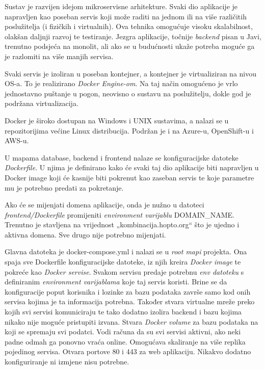 		
		Sustav je razvijen idejom mikroservisne arhitekture. Svaki dio aplikacije je napravljen kao poseban servis koji može raditi na jednom ili na više različitih poslužitelja (i fizičkih i virtualnih). Ova tehnika omogućuje visoku skalabilnost, olakšan daljnji razvoj te testiranje. Jezgra aplikacije, točnije  \textit{backend} pisan u Javi, trenutno podsjeća na monolit, ali ako se u budućnosti ukaže potreba moguće ga je razlomiti na više manjih servisa. 

		Svaki servis je izoliran u poseban kontejner, a kontejner je virtualiziran na nivou OS-a. To je realizirano  \textit{Docker Engine-om}. Na taj način omogućeno je vrlo jednostavno puštanje u pogon, neovisno o sustavu na poslužitelju, dokle god je podržana virtualizacija. 

		Docker je široko dostupan na Windows i UNIX sustavima, a nalazi se u repozitorijima većine Linux distribucija. Podržan je i na Azure-u, OpenShift-u i AWS-u.\\
		
		
		
	
		U mapama database, backend i frontend nalaze se konfiguracijske datoteke  \textit{Dockerfile}. U njima je definirano kako će svaki taj dio aplikacije biti napravljen u Docker image koji će kasnije biti pokrenut kao zaseban servis te koje parametre mu je potrebno predati za pokretanje. 
			
			Ako će se mijenjati domena aplikacije, onda je nužno u datoteci  \textit{frontend/Dockerfile} promijeniti  \textit{environment varijablu} DOMAIN\_NAME. Trenutno je stavljena na vrijednost „kombinacija.hopto.org“ što je ujedno i aktivna domena. Sve drugo nije potrebno mijenjati.
			
    			Glavna datoteka je docker-compose.yml i nalazi se u  \textit{root mapi} projekta. Ona spaja sve Dockerfile konfiguracijske datoteke, iz njih kreira  \textit{Docker image} te pokreće kao  \textit{Docker servise}. Svakom servisu predaje potrebnu  \textit{env datoteku} s definiranim  \textit{environment varijablama} koje taj servis koristi. Brine se da konfiguracije poput korisnika i lozinke za bazu podataka završe samo kod onih servisa kojima je ta informacija potrebna. Također stvara virtualne mreže preko kojih svi servisi komuniciraju te tako dodatno izolira backend i bazu kojima nikako nije moguće pristupiti izvana. Stvara  \textit{Docker volume} za bazu podataka na koji se spremaju svi podatci. Vodi računa da su svi servisi aktivni, ako neki padne odmah ga ponovno vraća online. Omogućava skaliranje na više replika pojedinog servisa. Otvara portove 80 i 443 za web aplikaciju. Nikakvo dodatno konfiguriranje ni izmjene nisu potrebne.
	
